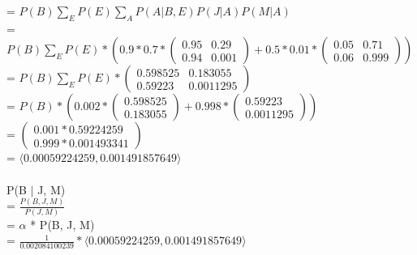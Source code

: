 \documentclass{article}
\begin{document}
\indent 
= $P(B)\sum_{E}P(E)\sum_{A}P(A \vert B, E)P(J \vert A)P(M \vert A)$ \\ 

\indent 
= $P(B)\sum_{E}P(E)* (0.9 * 0.7 * 
\left(\begin{array}{cc} 
        0.95 & 0.29 \\ 
        0.94 & 0.001 
        \end{array}\right) + 
0.5 * 0.01 * 
\left(\begin{array}{cc} 
        0.05 & 0.71 \\ 
        0.06 & 0.999 
        \end{array}\right))$ \\ 

\indent 
= $P(B)\sum_{E}P(E) * 
    \left(\begin{array}{cc} 
        0.598525 & 0.183055 \\ 
        0.59223 & 0.0011295 
        \end{array}\right)$ \\ 

\indent 
= $P(B)*(0.002 * 
    \left(\begin{array}{c} 
        0.598525\\ 
        0.183055 
        \end{array}\right) + 
    0.998 * 
    \left(\begin{array}{c} 
        0.59223 \\ 
        0.0011295
        \end{array}\right))$ \\ 

\indent 
= $\left(\begin{array}{c} 
        0.001 * 0.59224259 \\ 
        0.999 * 0.001493341
        \end{array}\right)$\\ 

\indent 
= $\langle 0.00059224259, 0.001491857649 \rangle$ \\ 
\\

\noindent
P(B $\vert$ J, M) \\

\indent
= $\frac{P(B, J, M)}{P(J, M)}$ \\

\indent
= $\alpha$ * P(B, J, M) \\

\indent 
= $\frac{1}{0.002084100239}*\langle 0.00059224259, 0.001491857649 \rangle$ \\ 
\end{document}

